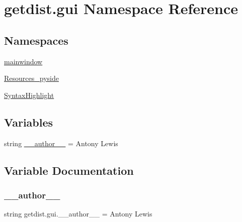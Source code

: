 \hypertarget{namespacegetdist_1_1gui}{}\section{getdist.\+gui Namespace Reference}
\label{namespacegetdist_1_1gui}
\subsection*{Namespaces}
\begin{DoxyCompactItemize}
\item 
 \mbox{\hyperlink{namespacegetdist_1_1gui_1_1mainwindow}{mainwindow}}
\item 
 \mbox{\hyperlink{namespacegetdist_1_1gui_1_1Resources__pyside}{Resources\+\_\+pyside}}
\item 
 \mbox{\hyperlink{namespacegetdist_1_1gui_1_1SyntaxHighlight}{Syntax\+Highlight}}
\end{DoxyCompactItemize}
\subsection*{Variables}
\begin{DoxyCompactItemize}
\item 
string \mbox{\hyperlink{namespacegetdist_1_1gui_a39c50c6b8efb3d373c27a27457895bbd}{\+\_\+\+\_\+author\+\_\+\+\_\+}} = \textquotesingle{}Antony Lewis\textquotesingle{}
\end{DoxyCompactItemize}


\subsection{Variable Documentation}
\mbox{\label{namespacegetdist_1_1gui_a39c50c6b8efb3d373c27a27457895bbd}} 
\subsubsection{\texorpdfstring{\+\_\+\+\_\+author\+\_\+\+\_\+}{\_\_author\_\_}}
{\footnotesize\ttfamily string getdist.\+gui.\+\_\+\+\_\+author\+\_\+\+\_\+ = \textquotesingle{}Antony Lewis\textquotesingle{}\hspace{0.3cm}{\ttfamily [private]}}

